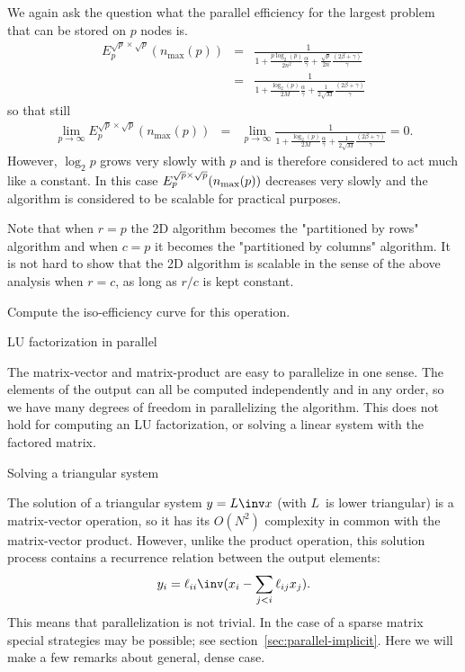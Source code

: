 We again ask the question what the parallel 
efficiency for the largest problem that can be stored on $ p $ nodes is.
\begin{eqnarray*}
E_p^{\sqrt{p} \times \sqrt{p}}(n_{\max}(p)) &=& 
\frac{1}
{ 1 + \frac{p \log_2(p)}{2 n^2} \frac{\alpha}{\gamma} 
+ \frac{\sqrt{p}}{2n}\frac{
\left( 2 \beta + \gamma \right)}{\gamma}}
\\
&=&
\frac{1}
{ 1 + \frac{\log_2(p)}{2 M} \frac{\alpha}{\gamma} 
+ \frac{1}{2\sqrt{M}}\frac{
\left( 2 \beta + \gamma \right)}{\gamma}}
\end{eqnarray*}
so that still
\begin{eqnarray*}
\lim_{p \rightarrow \infty}
E_p^{\sqrt{p} \times \sqrt{p}}(n_{\max}(p)) &=& 
\lim_{p \rightarrow \infty}
\frac{1}
{ 1 + \frac{\log_2(p)}{2 M} \frac{\alpha}{\gamma} 
+ \frac{1}{2\sqrt{M}}\frac{
\left( 2 \beta + \gamma \right)}{\gamma}}
=
0.
\end{eqnarray*}
However, $ \log_2{p} $ grows very slowly with $ p $ and is therefore
considered to act much like a constant.  In this case 
$ E_p^{\sqrt{p}\times \sqrt{p}}( n_{\rm max}(p) ) $ decreases very slowly and the algorithm is considered to be scalable for practical purposes.


Note that when $ r = p $ the 2D algorithm becomes the "partitioned by
rows" algorithm and when $ c = p $ it becomes the "partitioned by
columns" algorithm.  It is not hard to show that the 2D algorithm is
scalable in the sense of the above analysis
when $ r = c $, as long as $r/c$ is kept constant.

\begin{exercise}
  Compute the iso-efficiency curve for this operation.
\end{exercise}

 {LU factorization in parallel}

The matrix-vector and matrix-product are easy to parallelize in one sense.
The elements of the output can all be computed independently and in any order,
so we have many degrees of freedom in parallelizing the algorithm.
This does not hold for computing an LU factorization, or solving a linear system
with the factored matrix.

 {Solving a triangular system}

The solution of a triangular system $y=L\inv x$ (with $L$~is lower triangular)
is a matrix-vector operation, so
it has its $O(N^2)$ complexity in common with the matrix-vector product.
However, unlike the product operation, this solution process contains a recurrence
relation between the output elements: 
\[ y_{i} = \ell_{ii}\inv ( x_i-\sum_{j<i} \ell_{ij}x_j ). \]
This means that parallelization is not trivial.
In the case of a sparse matrix special strategies may be possible; see section~\ref{sec:parallel-implicit}.
Here we will make a few remarks about general, dense case.

